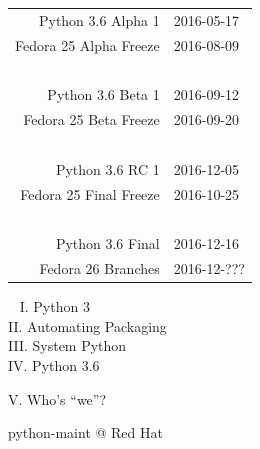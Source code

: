 \documentclass[1610,20pt]{beamer}
\newcommand\sk{\par\bigskip\bigskip\par}
\begin{document}
\begin{center}
\begin{frame}[fragile]

    \small
    \begin{tabular}{rl}
    Python 3.6 Alpha 1 & 2016-05-17 \\
    \color{fedblue} Fedora 25 Alpha Freeze & \color{fedblue} 2016-08-09 \\
    \pause~\\
    Python 3.6 Beta 1 & 2016-09-12 \\
    \color{fedblue} Fedora 25 Beta Freeze & \color{fedblue} 2016-09-20 \\
    \pause~\\
    Python 3.6 RC 1 & 2016-12-05 \\
    \color{fedblue} Fedora 25 Final Freeze & \color{fedblue} 2016-10-25 \\
    \pause~\\
    Python 3.6 Final & 2016-12-16 \\
    \color{fedblue} Fedora 26 Branches& \color{fedblue} 2016-12-??? \\
    \end{tabular}
\end{frame}

{
\begin{frame}[fragile]~
    {\color{mutegray} I. Python 3} \\
    {\color{mutegray} II. Automating Packaging} \\
    {\color{mutegray} III. System Python} \\
    {\color{mutegray} IV. Python 3.6} \\

    \sk\color{white}

    \huge
    V. Who's “we”?
\end{frame}
}

\begin{frame}[fragile]
    python-maint @ Red Hat
    \sk


\end{frame}
\end{center}
\end{document}
